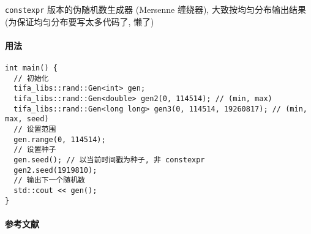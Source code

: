 \verb|constexpr| 版本的伪随机数生成器 (Mersenne 缠绕器), 大致按均匀分布输出结果 (为保证均匀分布要写太多代码了, 懒了)

\paragraph{用法}

\begin{verbatim}
int main() {
  // 初始化
  tifa_libs::rand::Gen<int> gen;
  tifa_libs::rand::Gen<double> gen2(0, 114514); // (min, max)
  tifa_libs::rand::Gen<long long> gen3(0, 114514, 19260817); // (min, max, seed)
  // 设置范围
  gen.range(0, 114514);
  // 设置种子
  gen.seed(); // 以当前时间戳为种子, 非 constexpr
  gen2.seed(1919810);
  // 输出下一个随机数
  std::cout << gen();
}
\end{verbatim}

\paragraph{参考文献} \cite{matsumoto1998mersenne} \cite{szHugyi2013random}
